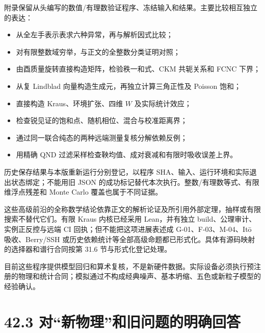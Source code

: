 \documentclass[
  11pt,
  oneside]{book}
\providecommand{\tightlist}{%
  \setlength{\itemsep}{0pt}\setlength{\parskip}{0pt}}
\begin{document}
附录保留从头编写的数值/有理数验证程序、冻结输入和结果。主要比较相互独立的表达：

\begin{itemize}
\tightlist
\item
  从全左手表示表求六种异常，再与解析因式比较；
\item
  对有限整数域穷举，与正文的全整数分类证明对照；
\item
  由酉质量旋转直接构造矩阵，检验秩一和式、CKM 共轭关系和 FCNC 下界；
\item
  从复 Lindblad 向量构造生成元，再独立计算三角正性及 Poisson 饱和；
\item
  直接构造 Kraus、环境扩张、四维 \(W\) 及实际统计效应；
\item
  检查锐见证的饱和点、随机相位、混合与校准距离界；
\item
  通过同一联合纯态的两种远端测量复核分解依赖反例；
\item
  用精确 QND 过滤采样检查鞅均值、成对衰减和有限时吸收误差上界。
\end{itemize}

历史保存结果与本版重新运行分别登记，以程序
SHA、输入、运行环境和实际退出状态绑定；不能用旧 JSON
的成功标记替代本次执行。整数/有理数等式、有限维浮点残差和 Monte Carlo
覆盖也属于不同证据。

这些高级前沿的全称数学结论依靠正文的解析论证及所引用外部定理，抽样或有限搜索不替代它们。有限
Kraus 内核已经采用 Lean，并有独立 build、公理审计、实例正反控与远端 CI
回执；但不能把这项进展表述成 G-01、F-03、M-04、Itō 吸收、Berry/SSH
或历史依赖统计等全部高级命题都已形式化。具体有源码映射的选择器和谱行合同按第
31.6 节与形式化登记处理。

目前这些程序提供模型回归和算术复核，不是新硬件数据。实际设备必须执行预注册的物理和统计合同；模拟通过不构成经典噪声、基本坍缩、五色或新粒子模型的经验确认。

\hypertarget{ux5bf9ux65b0ux7269ux7406ux548cux65e7ux95eeux9898ux7684ux660eux786eux56deux7b54}{%
\section{42.3
对``新物理''和旧问题的明确回答}\label{ux5bf9ux65b0ux7269ux7406ux548cux65e7ux95eeux9898ux7684ux660eux786eux56deux7b54}}
\end{document}
